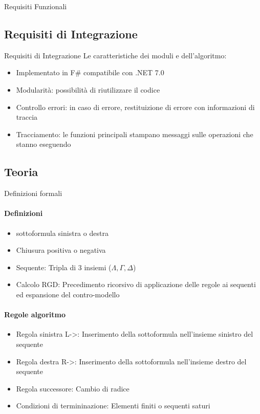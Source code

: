 \documentclass{beamer}
\begin{document}
\begin{darkframes}
\begin{frame}{Requisiti Funzionali}
    \end{frame}

    \subsection{Requisiti di Integrazione}
    \begin{frame}{Requisiti di Integrazione}
        Le caratteristiche dei moduli e dell'algoritmo:
        \begin{itemize}
            \item Implementato in F\# compatibile con .NET 7.0
            \item Modularità: possibilità di riutilizzare il codice
            \item Controllo errori: in caso di errore, restituizione di errore con informazioni di traccia
            \item Tracciamento: le funzioni principali stampano messaggi sulle operazioni che stanno eseguendo
        \end{itemize}
    \end{frame}

    \subsection{Teoria}
    \begin{frame}{Definizioni formali}
        \framesubtitle{Definizioni}
        \begin{itemize}
            \item sottoformula sinistra o destra
            \item Chiusura positiva o negativa
            \item Sequente: Tripla di 3 insiemi ($\Lambda, \Gamma, \Delta$)
            \item Calcolo RGD: Precedimento ricorsivo di applicazione delle regole ai sequenti ed espansione del contro-modello
        \end{itemize}

        \framesubtitle{Regole algoritmo}
        \begin{itemize}
            \item Regola sinistra L->: Inserimento della sottoformula nell'insieme sinistro del sequente
            \item Regola destra R->: Inserimento della sottoformula nell'insieme destro del sequente
            \item Regola successore: Cambio di radice
            \item Condizioni di termininazione: Elementi finiti o sequenti saturi
        \end{itemize}
    \end{frame}


\end{darkframes}
\end{document}
